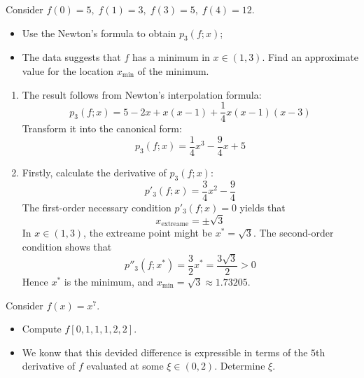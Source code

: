 \documentclass[11pt]{elegantbook}
\begin{document}
\vspace{1.5em}

\begin{problem}
  Consider $f(0)=5,\; f(1)=3,\; f(3)=5,\; f(4)=12$.
  \begin{itemize}
    \item Use the Newton's formula to obtain $p_3(f;x)$;
    \item The data suggests that $f$ has a minimum in $x\in(1,3)$. Find an approximate value for the location $x_\text{min}$ of the minimum.
  \end{itemize}
\end{problem}

\begin{solution}
  \begin{enumerate}
    \item The result follows from Newton's interpolation formula:
    \begin{equation*}
      p_3(f;x)=5-2x+x(x-1)+\frac{1}{4}x(x-1)(x-3)
    \end{equation*}
    Transform it into the canonical form:
    \begin{equation*}
      p_3(f;x)=\frac{1}{4}x^{3}-\frac{9}{4}x + 5
    \end{equation*}
    \item Firstly, calculate the derivative of $p_3(f;x)$:
    \begin{equation*}
      p'_3(f;x)=\frac{3}{4}x^{2}-\frac{9}{4}
    \end{equation*}
    The first-order necessary condition $p'_3(f;x)=0$ yields that
    \begin{equation*}
      x_\text{extreame} = \pm \sqrt{3}
    \end{equation*}
    In $x\in(1,3)$, the extreame point might be $x^*=\sqrt{3}$. The second-order condition shows that
    \begin{equation*}
      p''_3(f;x^*)=\frac{3}{2}x^* = \frac{3\sqrt{3}}{2} > 0
    \end{equation*}
    Hence $x^*$ is the minimum, and $x_\text{min}=\sqrt{3}\approx 1.73205$.
  \end{enumerate}
\end{solution}

\vspace{1.5em}

\begin{problem}
  Consider $f(x)=x^7$.
  \begin{itemize}
    \item Compute $f[0,1,1,1,2,2]$.
    \item We konw that this devided difference is expressible in terms of the $5$th derivative of $f$ evaluated at some $\xi\in(0,2)$. Determine $\xi$.
  \end{itemize}
\end{problem}
\end{document}
